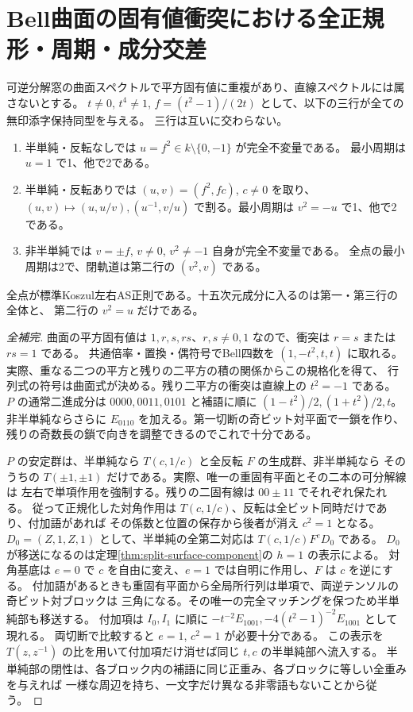 \section{Bell曲面の固有値衝突における全正規形・周期・成分交差}
\label{sec:split-repeated-surface}
\begin{theorem}\label{thm:split-repeated-surface}
可逆分解窓の曲面スペクトルで平方固有値に重複があり、直線スペクトルには属さないとする。
$t\ne0$, $t^4\ne1$, $f=(t^2-1)/(2t)$ として、以下の三行が全ての無印添字保持同型を与える。
三行は互いに交わらない。
\begin{enumerate}
\item 半単純・反転なしでは $u=f^2\in k\setminus\{0,-1\}$ が完全不変量である。
最小周期は $u=1$ で1、他で2である。
\item 半単純・反転ありでは $(u,v)=(f^2,fc)$, $c\ne0$ を取り、
$(u,v)\mapsto(u,u/v),(u^{-1},v/u)$ で割る。最小周期は $v^2=-u$ で1、他で2である。
\item 非半単純では $v=\pm f$, $v\ne0$, $v^2\ne-1$ 自身が完全不変量である。
全点の最小周期は2で、閉軌道は第二行の $(v^2,v)$ である。
\end{enumerate}
全点が標準Koszul左右AS正則である。十五次元成分に入るのは第一・第三行の全体と、
第二行の $v^2=u$ だけである。
\end{theorem}
\begin{proof}[全補完]
曲面の平方固有値は $1,r,s,rs$、$r,s\ne0,1$ なので、衝突は $r=s$ または $rs=1$ である。
共通倍率・置換・偶符号でBell四数を $(1,-t^2,t,t)$ に取れる。
実際、重なる二つの平方と残りの二平方の積の関係からこの規格化を得て、
行列式の符号は曲面式が決める。残り二平方の衝突は直線上の $t^2=-1$ である。
$P$ の通常二進成分は $0000,0011,0101$ と補語に順に $(1-t^2)/2,(1+t^2)/2,t$。
非半単純ならさらに $E_{0110}$ を加える。第一切断の奇ビット対平面で一鎖を作り、
残りの奇数長の鎖で向きを調整できるのでこれで十分である。

$P$ の安定群は、半単純なら $T(c,1/c)$ と全反転 $F$ の生成群、非半単純なら
そのうちの $T(\pm1,\pm1)$ だけである。実際、唯一の重固有平面とその二本の可分解線は
左右で単項作用を強制する。残りの二固有線は $00\pm11$ でそれぞれ保たれる。
従って正規化した対角作用は $T(c,1/c)$、反転は全ビット同時だけであり、付加語があれば
その係数と位置の保存から後者が消え $c^2=1$ となる。
$D_0=(Z,1,Z,1)$ として、半単純の全第二対応は $T(c,1/c)F^eD_0$ である。
$D_0$ が移送になるのは定理\ref{thm:split-surface-component}の $h=1$ の表示による。
対角基底は $e=0$ で $c$ を自由に変え、$e=1$ では自明に作用し、$F$ は $c$ を逆にする。
付加語があるときも重固有平面から全局所行列は単項で、両逆テンソルの奇ビット対ブロックは
三角になる。その唯一の完全マッチングを保つため半単純部も移送する。
付加項は $I_0,I_1$ に順に $-t^{-2}E_{1001},-4(t^2-1)^{-2}E_{1001}$ として現れる。
両切断で比較すると $e=1$, $c^2=1$ が必要十分である。
この表示を $T(z,z^{-1})$ の比を用いて付加項だけ消せば同じ $t,c$ の半単純部へ流入する。
半単純部の閉性は、各ブロック内の補語に同じ正重み、各ブロックに等しい全重みを与えれば
一様な周辺を持ち、一文字だけ異なる非零語もないことから従う。
\end{proof}

